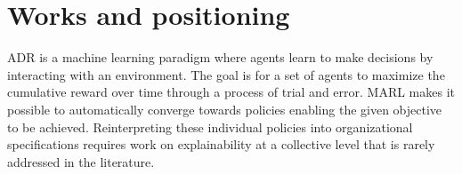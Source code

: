 \documentclass{ecai}
\newcommand{\probP}{\text{I\kern-0.15em P}}
\begin{document}




\section{Works and positioning}

ADR is a machine learning paradigm where agents learn to make decisions by interacting with an environment. The goal is for a set of agents to maximize the cumulative reward over time through a process of trial and error.
MARL makes it possible to automatically converge towards policies enabling the given objective to be achieved. Reinterpreting these individual policies into organizational specifications requires work on explainability at a collective level that is rarely addressed in the literature.
\end{document}
